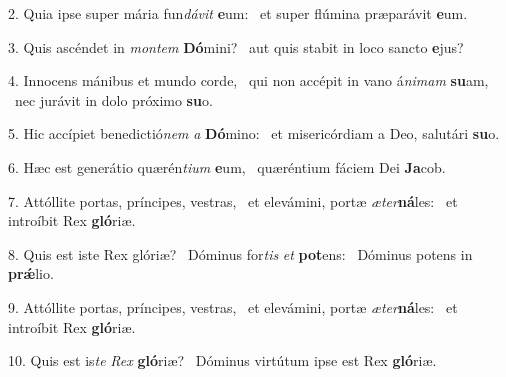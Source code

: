 2. Quia ipse super mária fun\textit{dá}\textit{vit} \textbf{e}um: \ast\  et super flúmina præparávit \textbf{e}um.\

3. Quis ascéndet in \textit{mon}\textit{tem} \textbf{Dó}mini? \ast\  aut quis stabit in loco sancto \textbf{e}jus?\

4. Innocens mánibus et mundo corde, \dag\  qui non accépit in vano á\textit{ni}\textit{mam} \textbf{su}am, \ast\  nec jurávit in dolo próximo \textbf{su}o.\

5. Hic accípiet benedictió\textit{nem} \textit{a} \textbf{Dó}mino: \ast\  et misericórdiam a Deo, salutári \textbf{su}o.\

6. Hæc est generátio quærén\textit{ti}\textit{um} \textbf{e}um, \ast\  quæréntium fáciem Dei \textbf{Ja}cob.\

7. Attóllite portas, príncipes, vestras, \dag\  et elevámini, portæ \textit{æ}\textit{ter}\textbf{ná}les: \ast\  et introíbit Rex \textbf{gló}riæ.\

8. Quis est iste Rex glóriæ? \dag\  Dóminus for\textit{tis} \textit{et} \textbf{pot}ens: \ast\  Dóminus potens in \textbf{prǽ}lio.\

9. Attóllite portas, príncipes, vestras, \dag\  et elevámini, portæ \textit{æ}\textit{ter}\textbf{ná}les: \ast\  et introíbit Rex \textbf{gló}riæ.\

10. Quis est is\textit{te} \textit{Rex} \textbf{gló}riæ? \ast\  Dóminus virtútum ipse est Rex \textbf{gló}riæ.\

